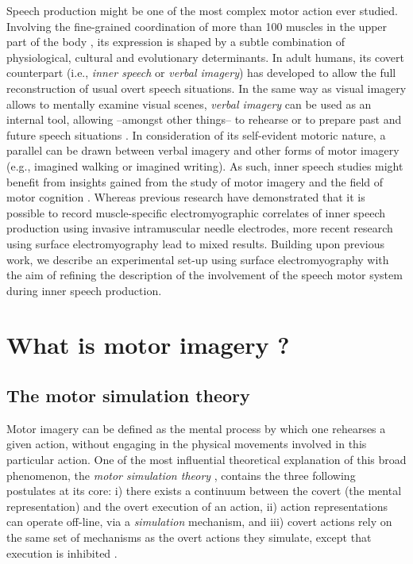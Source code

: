 \documentclass[a4paper,12pt,oneside,oldfontcommands]{memoir}
\begin{document}
Speech production might be one of the most complex motor action ever
studied. Involving the fine-grained coordination of more than 100
muscles in the upper part of the body \citep{simonyan_laryngeal_2011},
its expression is shaped by a subtle combination of physiological,
cultural and evolutionary determinants. In adult humans, its covert
counterpart (i.e., \emph{inner speech} or \emph{verbal imagery}) has
developed to allow the full reconstruction of usual overt speech
situations. In the same way as visual imagery allows to mentally examine
visual scenes, \emph{verbal imagery} can be used as an internal tool,
allowing --amongst other things-- to rehearse or to prepare past and
future speech situations \citep[for a review,
see][]{perrone-bertolotti_what_2014}. In consideration of its
self-evident motoric nature, a parallel can be drawn between verbal
imagery and other forms of motor imagery (e.g., imagined walking or
imagined writing). As such, inner speech studies might benefit from
insights gained from the study of motor imagery and the field of motor
cognition \citep[e.g.,][]{haggard_conscious_2005, jeannerod_motor_2006}.
Whereas previous research have demonstrated that it is possible to
record muscle-specific electromyographic correlates of inner speech
production using invasive intramuscular needle electrodes, more recent
research using surface electromyography lead to mixed results. Building
upon previous work, we describe an experimental set-up using surface
electromyography with the aim of refining the description of the
involvement of the speech motor system during inner speech production.

\section{What is motor imagery ?}\label{what-is-motor-imagery}

\subsection{The motor simulation
theory}\label{the-motor-simulation-theory}

Motor imagery can be defined as the mental process by which one
rehearses a given action, without engaging in the physical movements
involved in this particular action. One of the most influential
theoretical explanation of this broad phenomenon, the \emph{motor
simulation theory}
\citep[MST;][]{jeannerod_representing_1994, jeannerod_neural_2001, jeannerod_motor_2006},
contains the three following postulates at its core: i) there exists a
continuum between the covert (the mental representation) and the overt
execution of an action, ii) action representations can operate off-line,
via a \emph{simulation} mechanism, and iii) covert actions rely on the
same set of mechanisms as the overt actions they simulate, except that
execution is inhibited \citep{oshea_does_2017}.
\end{document}
